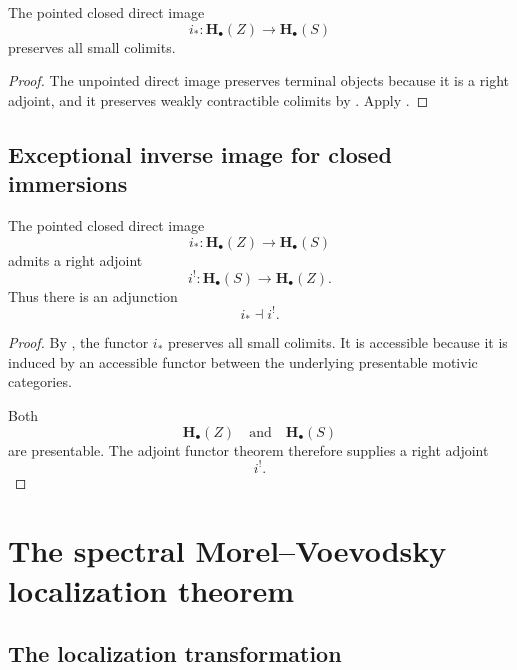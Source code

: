 \begin{corollary}
\label{cor:pointed-closed-direct-image-colimit-preserving}
The pointed closed direct image
\[
    i_*
    \colon
    \mathbf H_\bullet(Z)
    \longrightarrow
    \mathbf H_\bullet(S)
\]
preserves all small colimits.
\end{corollary}

\begin{proof}
The unpointed direct image preserves terminal objects because it is a
right adjoint, and it preserves weakly contractible colimits by
.  Apply
.
\end{proof}

\subsection{Exceptional inverse image for closed immersions}

\begin{proposition}
\label{prop:closed-exceptional-inverse-image}
The pointed closed direct image
\[
    i_*
    \colon
    \mathbf H_\bullet(Z)
    \longrightarrow
    \mathbf H_\bullet(S)
\]
admits a right adjoint
\[
    i^!
    \colon
    \mathbf H_\bullet(S)
    \longrightarrow
    \mathbf H_\bullet(Z).
\]
Thus there is an adjunction
\[
    i_*
    \dashv
    i^!.
\]
\end{proposition}

\begin{proof}
By
,
the functor \(i_*\) preserves all small colimits.  It is accessible
because it is induced by an accessible functor between the underlying
presentable motivic categories.

Both
\[
    \mathbf H_\bullet(Z)
    \quad\text{and}\quad
    \mathbf H_\bullet(S)
\]
are presentable.  The adjoint functor theorem therefore supplies a
right adjoint
\[
    i^!.
\]
\end{proof}

\section{The spectral Morel--Voevodsky localization theorem}
\label{sec:spectral-morel-voevodsky-localization}

\subsection{The localization transformation}

